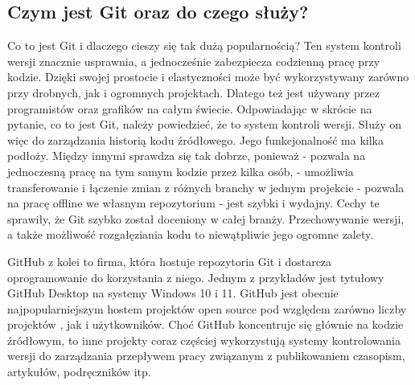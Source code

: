 \subsection{Czym jest Git oraz do czego służy?}
\hspace{0.60cm}Co to jest Git i dlaczego cieszy się tak dużą popularnością? Ten system kontroli wersji znacznie usprawnia, a jednocześnie zabezpiecza codzienną pracę przy kodzie. Dzięki swojej prostocie i elastyczności może być wykorzystywany zarówno przy drobnych, jak i ogromnych projektach. Dlatego też jest używany przez programistów oraz grafików na całym świecie. Odpowiadając w skrócie na pytanie, co to jest Git, należy powiedzieć, że to system kontroli wersji. Służy on więc do zarządzania historią kodu źródłowego. Jego funkcjonalność ma kilka podłoży. Między innymi sprawdza się tak dobrze, ponieważ\newline
- pozwala na jednoczesną pracę na tym samym kodzie przez kilka osób, \newline
- umożliwia transferowanie i łączenie zmian z różnych branchy w jednym projekcie\newline
- pozwala na pracę offline we własnym repozytorium \newline
- jest szybki i wydajny.\newline 
Cechy te sprawiły, że Git szybko został doceniony w całej branży. Przechowywanie wersji, a także możliwość rozgałęziania kodu to niewątpliwie jego ogromne zalety. 
\newline

GitHub z kolei to firma, która hostuje repozytoria Git i dostarcza oprogramowanie do korzystania z niego. Jednym z przykładów jest tytułowy GitHub Desktop na systemy Windows 10 i 11. GitHub jest obecnie najpopularniejszym hostem projektów open source pod względem zarówno liczby projektów , jak i użytkowników. Choć GitHub koncentruje się głównie na kodzie źródłowym, to inne projekty coraz częściej wykorzystują systemy kontrolowania wersji do zarządzania przepływem pracy związanym z publikowaniem czasopism, artykułów, podręczników itp.\newline



